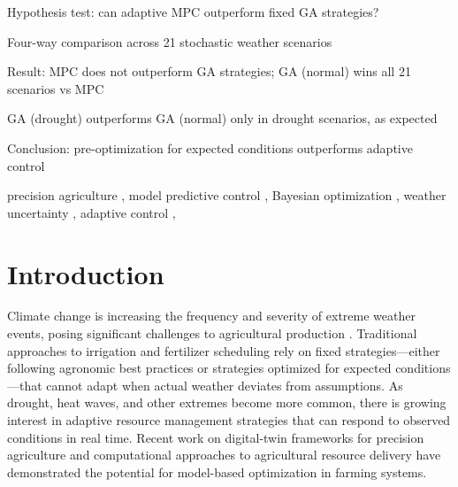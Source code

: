 \documentclass[preprint,12pt]{elsarticle}
\begin{document}
\begin{frontmatter}

\begin{highlights}
\item Hypothesis test: can adaptive MPC outperform fixed GA strategies?
\item Four-way comparison across 21 stochastic weather scenarios
\item Result: MPC does not outperform GA strategies; GA (normal) wins all 21 scenarios vs MPC
\item GA (drought) outperforms GA (normal) only in drought scenarios, as expected
\item Conclusion: pre-optimization for expected conditions outperforms adaptive control
\end{highlights}

\begin{keyword}
precision agriculture \sep
model predictive control \sep
Bayesian optimization \sep
weather uncertainty \sep
adaptive control \sep
\end{keyword}

\end{frontmatter}

\section{Introduction}\label{sec:intro}

Climate change is increasing the frequency and severity of extreme weather events, posing significant challenges to agricultural production \cite{ipcc2021}. Traditional approaches to irrigation and fertilizer scheduling rely on fixed strategies---either following agronomic best practices or strategies optimized for expected conditions---that cannot adapt when actual weather deviates from assumptions. As drought, heat waves, and other extremes become more common, there is growing interest in adaptive resource management strategies that can respond to observed conditions in real time. Recent work on digital-twin frameworks for precision agriculture \cite{zohdi2024digitaltwin,mengi2023agrivoltaics} and computational approaches to agricultural resource delivery \cite{betancourt2024spray,tagkopoulos2024aifs} have demonstrated the potential for model-based optimization in farming systems.
\end{document}
